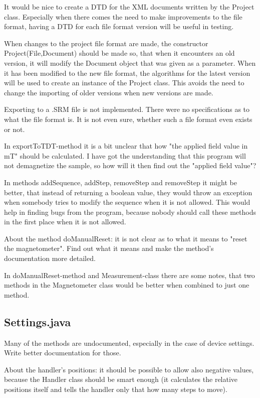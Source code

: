 It would be nice to create a DTD for the XML documents written by the Project class. Especially when there comes the need to make improvements to the file format, having a DTD for each file format version will be useful in testing.

When changes to the project file format are made, the constructor Project(File,Document) should be made so, that when it encounters an old version, it will modify the Document object that was given as a parameter. When it has been modified to the new file format, the algorithms for the latest version will be used to create an instance of the Project class. This avoids the need to change the importing of older versions when new versions are made.

Exporting to a .SRM file is not implemented. There were no specifications as to what the file format is. It is not even sure, whether such a file format even exists or not.

In exportToTDT-method it is a bit unclear that how "the applied field value in mT" should be calculated. I have got the understanding that this program will not demagnetize the sample, so how will it then find out the "applied field value"?

In methods addSequence, addStep, removeStep and removeStep it might be better, that instead of returning a boolean value, they would throw an exception when somebody tries to modify the sequence when it is not allowed. This would help in finding bugs from the program, because nobody should call these methods in the first place when it is not allowed.

About the method doManualReset: it is not clear as to what it means to "reset the magnetometer". Find out what it means and make the method's documentation more detailed.

In doManualReset-method and Measurement-class there are some notes, that two methods in the Magnetometer class would be better when combined to just one method.


\subsection{Settings.java}

Many of the methods are undocumented, especially in the case of device settings. Write better documentation for those.

About the handler's positions: it should be possible to allow also negative values, because the Handler class should be smart enough (it calculates the relative positions itself and tells the handler only that how many steps to move).

